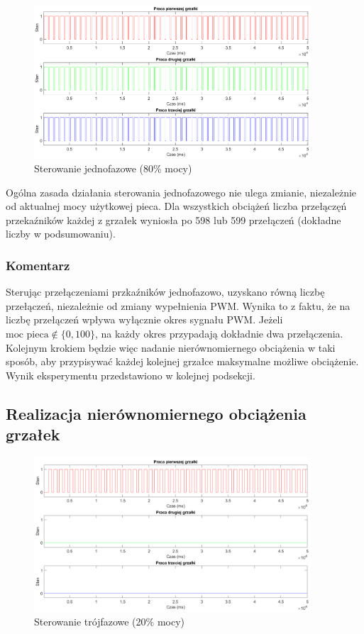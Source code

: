 \documentclass[a4paper,twoside,12pt]{book}
\begin{document}
\begin{figure}[h]
	\centering
	\includegraphics[width=0.92\textwidth]{./wykresy/png/onePhase80.png}
	\caption{Sterowanie jednofazowe (80\% mocy)}
	\label{fig:OnePhase80}
\end{figure}

\noindent Ogólna zasada działania sterowania jednofazowego nie ulega zmianie, niezależnie od aktualnej mocy użytkowej pieca. Dla wszystkich obciążeń liczba przełączęń przekaźników każdej z grzałek wyniosła po 598 lub 599 przełączeń (dokładne liczby w podsumowaniu).

\newpage
\subsubsection{Komentarz}
Sterując przełączeniami przkaźników jednofazowo, uzyskano równą liczbę przełączeń, niezależnie od zmiany wypełnienia PWM. Wynika to z faktu, że na liczbę przełączeń wpływa wyłącznie okres sygnału PWM. Jeżeli \(\text{moc pieca} \notin \{0, 100\}\), na każdy okres przypadają dokładnie dwa przełączenia. Kolejnym krokiem będzie więc nadanie nierównomiernego obciążenia w taki sposób, aby przypisywać każdej kolejnej grzałce maksymalne możliwe obciążenie. Wynik eksperymentu przedstawiono w kolejnej podsekcji.

\subsection{Realizacja nierównomiernego obciążenia grzałek}
\begin{figure}[h]
	\centering
	\includegraphics[width=0.92\textwidth]{./wykresy/png/threePhase20worse.png}
	\caption{Sterowanie trójfazowe (20\% mocy)}
	\label{fig:ThreePhase20worse}
\end{figure}
\end{document}
